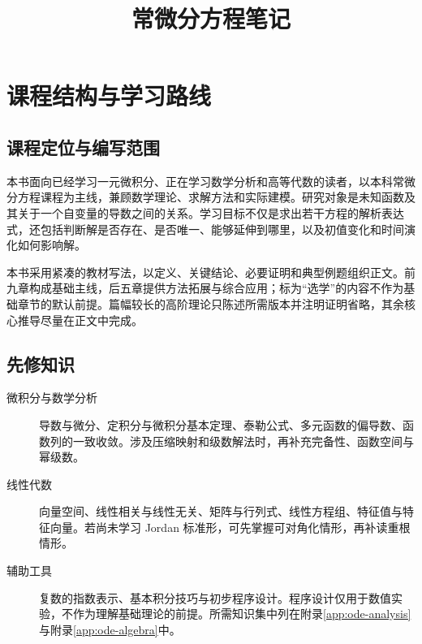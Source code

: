 \documentclass[UTF8,12pt,a4paper,fontset=fandol]{ctexbook}
\title{常微分方程笔记}
\author{}
\date{}
\begin{document}
\frontmatter
\maketitle
\tableofcontents

\chapter{课程结构与学习路线}
\label{chap:ode-roadmap}

\section*{课程定位与编写范围}
本书面向已经学习一元微积分、正在学习数学分析和高等代数的读者，以本科常微分方程课程为主线，兼顾数学理论、求解方法和实际建模。研究对象是未知函数及其关于一个自变量的导数之间的关系。学习目标不仅是求出若干方程的解析表达式，还包括判断解是否存在、是否唯一、能够延伸到哪里，以及初值变化和时间演化如何影响解。

本书采用紧凑的教材写法，以定义、关键结论、必要证明和典型例题组织正文。前九章构成基础主线，后五章提供方法拓展与综合应用；标为“选学”的内容不作为基础章节的默认前提。篇幅较长的高阶理论只陈述所需版本并注明证明省略，其余核心推导尽量在正文中完成。

\section*{先修知识}
\begin{description}
  \item[微积分与数学分析] 导数与微分、定积分与微积分基本定理、泰勒公式、多元函数的偏导数、函数列的一致收敛。涉及压缩映射和级数解法时，再补充完备性、函数空间与幂级数。
  \item[线性代数] 向量空间、线性相关与线性无关、矩阵与行列式、线性方程组、特征值与特征向量。若尚未学习 Jordan 标准形，可先掌握可对角化情形，再补读重根情形。
  \item[辅助工具] 复数的指数表示、基本积分技巧与初步程序设计。程序设计仅用于数值实验，不作为理解基础理论的前提。所需知识集中列在附录\ref{app:ode-analysis}与附录\ref{app:ode-algebra}中。
\end{description}
\end{document}
